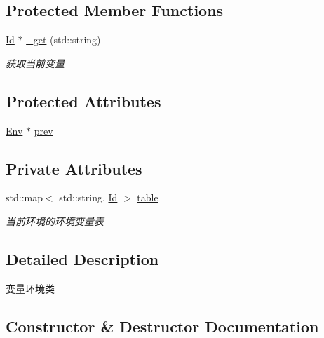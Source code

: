 \subsection*{Protected Member Functions}
\begin{DoxyCompactItemize}
\item 
\hyperlink{class_id}{Id} $\ast$ \hyperlink{class_env_aca71253ff9d30153d0834a47cd35a351}{\+\_\+get} (std\+::string)
\begin{DoxyCompactList}\small\item\em 获取当前变量 \end{DoxyCompactList}\end{DoxyCompactItemize}
\subsection*{Protected Attributes}
\begin{DoxyCompactItemize}
\item 
\hyperlink{class_env}{Env} $\ast$ \hyperlink{class_env_a79a41e9166e949e4c1320ffe3750cb29}{prev}
\end{DoxyCompactItemize}
\subsection*{Private Attributes}
\begin{DoxyCompactItemize}
\item 
\mbox{\label{class_env_ab93397b135a614cb1c7e6057a00a8d85}} 
std\+::map$<$ std\+::string, \hyperlink{class_id}{Id} $>$ \hyperlink{class_env_ab93397b135a614cb1c7e6057a00a8d85}{table}
\begin{DoxyCompactList}\small\item\em 当前环境的环境变量表 \end{DoxyCompactList}\end{DoxyCompactItemize}


\subsection{Detailed Description}
变量环境类 

\subsection{Constructor \& Destructor Documentation}
\mbox{\label{class_env_ab9d20c5b47453e30038f156cc5e25c0f}} 
